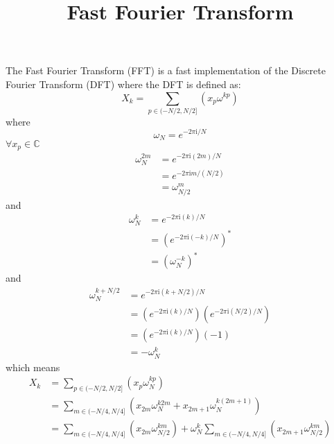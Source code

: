 \documentclass{article}
\begin{document}
%
\title{Fast Fourier Transform}
%
\maketitle
%
The Fast Fourier Transform (FFT) is a fast implementation of the Discrete Fourier Transform (DFT) where the DFT is defined as:
%
\begin {equation} \label {eq:dft}
X_k = \sum_{p \in (-N/2, N/2]} (x_p \omega^{k p})
\end {equation}
%
where
%
\begin {equation} \label {eq:twiddle}
\omega_N = e^{-2 \pi \mathrm {i} / N}
\end {equation}
%
$\forall x_p \in \mathbb {C}$
%
\begin {equation}
\begin {aligned}
\omega_N^{2m} &= e^{-2 \pi \mathrm {i} (2m) / N}    \\
              &= e^{-2 \pi \mathrm {i} m / (N / 2)} \\
              &= \omega_{N/2}^m
\end {aligned}
\end {equation}
%
and
%
\begin {equation}
\begin {aligned}
\omega_N^{k} &= e^{-2 \pi \mathrm {i} (k) / N}                   \\
             &= \left (e^{-2 \pi \mathrm {i} (-k) / N} \right)^* \\
             &= \left (\omega_{N}^{-k} \right)^*
\end {aligned}
\end {equation}
%
and
%
\begin {equation}
\begin {aligned}
\omega_N^{k + N/2} &= e^{-2 \pi \mathrm {i} (k + N/2) / N} \\
             &= \left (e^{-2 \pi \mathrm {i} (k) / N} \right) \left (e^{-2 \pi \mathrm {i} (N/2) / N} \right) \\
             &= \left (e^{-2 \pi \mathrm {i} (k) / N} \right) \left (-1 \right) \\
             &= -\omega_{N}^{k}
\end {aligned}
\end {equation}
%
which means
%
\begin {equation}
\begin {aligned}
X_k &= \sum_{p \in (-N/2, N/2]} (x_p \omega_N^{k p}) \\
    &= \sum_{m \in (-N/4, N/4]} (x_{2m} \omega_N^{k 2 m} + x_{2m+1} \omega_N^{k (2 m + 1)}) \\
    &= \sum_{m \in (-N/4, N/4]} (x_{2m} \omega_{N/2}^{k m}) + \omega_N^{k} \sum_{m \in (-N/4, N/4]} (x_{2m+1} \omega_{N/2}^{km})
\end {aligned}
\end {equation}
\end{document}
